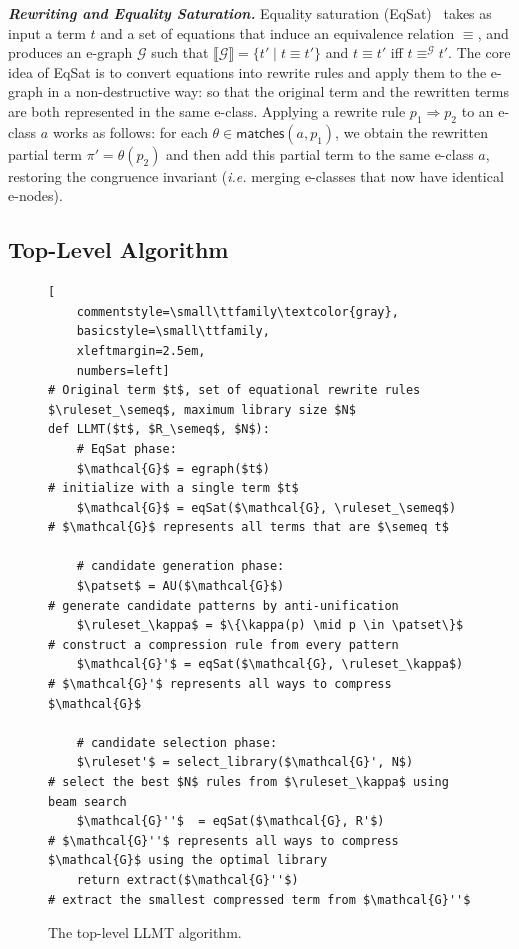 \documentclass[acmsmall,screen,nonacm,review=false,timestamp=false]{acmart}
\newcommand{\ie}{\emph{i.e.}\xspace}
\newcommand{\emphbf}[1]{\emph{\textbf{#1}\xspace}}
\newcommand{\mypara}[1]{\smallskip\noindent\emphbf{#1.}\xspace}
\newcommand{\semeq}{\equiv}
\newcommand{\sapp}[2]{{#1}({#2})}
\newcommand{\matches}[2]{\mathsf{matches}(#1,#2)}
\newcommand{\denot}[1]{\llbracket #1 \rrbracket}
\newcommand{\eqg}{\semeq^{\mathcal{G}}}
\newcommand{\ruleset}{\mathcal{R}}
\newcommand{\patset}{\mathcal{P}}
\begin{document}
\mypara{Rewriting and Equality Saturation}
Equality saturation (EqSat)~\cite{tate2009equality,willsey2021egg} 
takes as input a term $t$ and a set of equations that induce an equivalence relation $\semeq$,
and produces an e-graph $\mathcal{G}$ such that $\denot{\mathcal{G}} = \{t' \mid t \semeq t'\}$
and $t \semeq t'$ iff $t \eqg t'$.
The core idea of EqSat is to convert equations into rewrite rules
and apply them to the e-graph in a non-destructive way:
so that the original term and the rewritten terms are both represented in the same e-class.
Applying a rewrite rule $p_1 \Rightarrow p_2$ to an e-class $a$ works as follows:
for each $\theta \in \matches{a}{p_1}$, 
we obtain the rewritten partial term $\pi' = \sapp{\theta}{p_2}$
and then add this partial term to the same e-class $a$,
restoring the congruence invariant
(\ie merging e-classes that now have identical e-nodes).

\subsection{Top-Level Algorithm}

\begin{figure}
\begin{lstlisting}[
    commentstyle=\small\ttfamily\textcolor{gray},
    basicstyle=\small\ttfamily,
    xleftmargin=2.5em,
    numbers=left]
# Original term $t$, set of equational rewrite rules $\ruleset_\semeq$, maximum library size $N$
def LLMT($t$, $R_\semeq$, $N$):
    # EqSat phase:
    $\mathcal{G}$ = egraph($t$)                            # initialize with a single term $t$
    $\mathcal{G}$ = eqSat($\mathcal{G}, \ruleset_\semeq$)  # $\mathcal{G}$ represents all terms that are $\semeq t$

    # candidate generation phase:
    $\patset$ = AU($\mathcal{G}$)                          # generate candidate patterns by anti-unification
    $\ruleset_\kappa$ = $\{\kappa(p) \mid p \in \patset\}$ # construct a compression rule from every pattern
    $\mathcal{G}'$ = eqSat($\mathcal{G}, \ruleset_\kappa$) # $\mathcal{G}'$ represents all ways to compress $\mathcal{G}$

    # candidate selection phase:
    $\ruleset'$ = select_library($\mathcal{G}', N$)        # select the best $N$ rules from $\ruleset_\kappa$ using beam search
    $\mathcal{G}''$  = eqSat($\mathcal{G}, R'$)            # $\mathcal{G}''$ represents all ways to compress $\mathcal{G}$ using the optimal library          
    return extract($\mathcal{G}''$)                        # extract the smallest compressed term from $\mathcal{G}''$
\end{lstlisting}
  \caption{The top-level LLMT algorithm.}
\label{fig:algo-llmt}
\end{figure}
\end{document}
